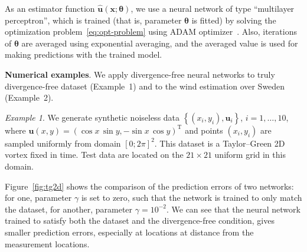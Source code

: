 \documentclass[pamm,a4paper,fleqn]{w-art}
\newcommand{\T}{\ensuremath{\text{T}}}
\renewcommand{\vec}[1]{\boldsymbol{#1}}
\begin{document}
As an estimator function $\hat{\vec u}(\vec x; \vec\theta)$, we use a neural network
of type ``multilayer perceptron''\cite{GoodfellowEtAl2016}, which is trained
(that is, parameter $\vec\theta$ is fitted) by solving 
the optimization problem~\eqref{eq:opt-problem} using ADAM
optimizer~\cite{KingmaBa2014}.
Also, iterations of $\vec\theta$ are averaged using exponential
averaging, and the averaged value is used for making predictions with the
trained model.

\textbf{Numerical examples}.
We apply divergence-free neural networks to truly divergence-free dataset
(Example~1) and to the wind estimation over Sweden (Example~2).

\emph{Example 1}.
We generate synthetic noiseless data
  $\left\{(x_i, y_i), \vec{u}_i\right\}$, $i = 1, \dots, 10$,
where $\vec u(x, y) = ( \cos x \, \sin y, -\sin x \, \cos y)^\T$
and points $(x_i, y_i)$ are sampled uniformly from domain $[0; 2\pi]^2$.
This dataset is a Taylor--Green 2D vortex fixed in time.
Test data are located on the $21\times21$ uniform grid in this domain.

Figure~\ref{fig:tg2d} shows the comparison of the prediction errors of two
networks: for one, parameter $\gamma$ is set to zero, such that the network is
trained to only match the dataset, for another, parameter $\gamma = 10^{-2}$.
We can see that the neural network trained to satisfy both  the dataset and the
divergence-free condition, gives smaller prediction errors, especially at
locations at distance from the measurement locations.
\end{document}
